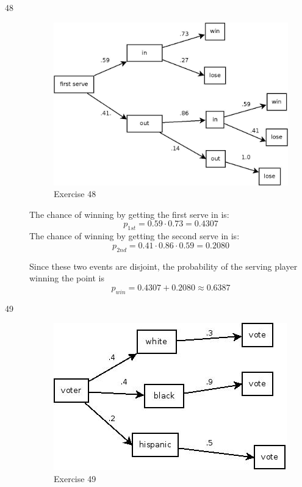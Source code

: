 \documentclass[letterpaper, landscape]{exam}
\begin{document}
\begin{description}
    \item[48]
      \begin{figure}[H]
        \centering
        \includegraphics[scale = 0.2]{ex48.jpg}
        \caption{Exercise 48}
      \end{figure}

      The chance of winning by getting the first serve in is:
      \[
        p_{1st} = 0.59 \cdot 0.73 = 0.4307
      \]
      The chance of winning by getting the second serve in is:
      \[
        p_{2nd} = 0.41 \cdot 0.86 \cdot 0.59 = 0.2080
      \]

      Since these two events are disjoint, the probability of the serving player
      winning the point is
      \[
        p_{win} = 0.4307 + 0.2080 \approx \boxed{ 0.6387 }
      \]

    \item[49]
      \begin{figure}[H]
        \centering
        \includegraphics[scale = 0.4]{ex49.jpg}
        \caption{Exercise 49}
      \end{figure}


\end{description}
\end{document}
